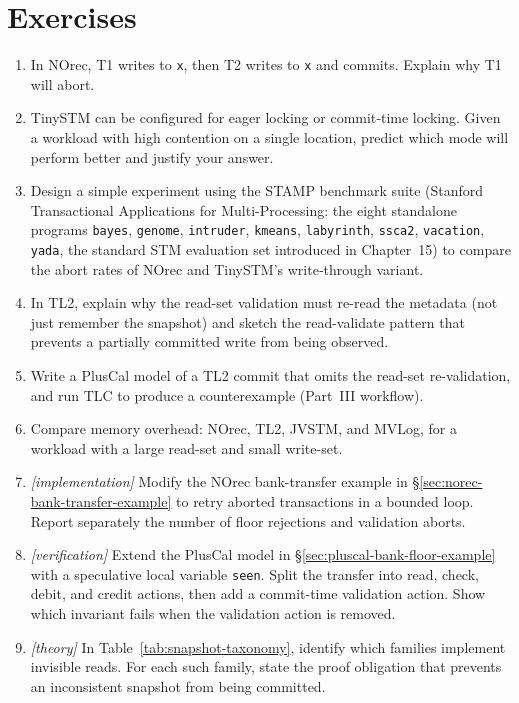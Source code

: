 \section{Exercises}
\begin{enumerate}
    \item In NOrec, T1 writes to \texttt{x}, then T2 writes to \texttt{x} and commits. Explain why T1 will abort.
    \item TinySTM can be configured for eager locking or commit‑time locking. Given a workload with high contention on a single location, predict which mode will perform better and justify your answer.
    \item Design a simple experiment using the STAMP benchmark suite (Stanford Transactional Applications for Multi-Processing: the eight standalone programs \texttt{bayes}, \texttt{genome}, \texttt{intruder}, \texttt{kmeans}, \texttt{labyrinth}, \texttt{ssca2}, \texttt{vacation}, \texttt{yada}, the standard STM evaluation set introduced in Chapter~15) to compare the abort rates of NOrec and TinySTM's write‑through variant.
    \item In TL2, explain why the read-set validation must re-read the metadata (not just remember the snapshot) and sketch the read-validate pattern that prevents a partially committed write from being observed.
    \item Write a PlusCal model of a TL2 commit that omits the read-set re-validation, and run TLC to produce a counterexample (Part~III workflow).
    \item Compare memory overhead: NOrec, TL2, JVSTM, and MVLog, for a workload with a large read-set and small write-set.
    \item \emph{[implementation]} Modify the NOrec bank-transfer example in \S\ref{sec:norec-bank-transfer-example} to retry aborted transactions in a bounded loop.  Report separately the number of floor rejections and validation aborts.
    \item \emph{[verification]} Extend the PlusCal model in \S\ref{sec:pluscal-bank-floor-example} with a speculative local variable \texttt{seen}.  Split the transfer into read, check, debit, and credit actions, then add a commit-time validation action.  Show which invariant fails when the validation action is removed.
    \item \emph{[theory]} In Table~\ref{tab:snapshot-taxonomy}, identify which families implement invisible reads.  For each such family, state the proof obligation that prevents an inconsistent snapshot from being committed.

\end{enumerate}

